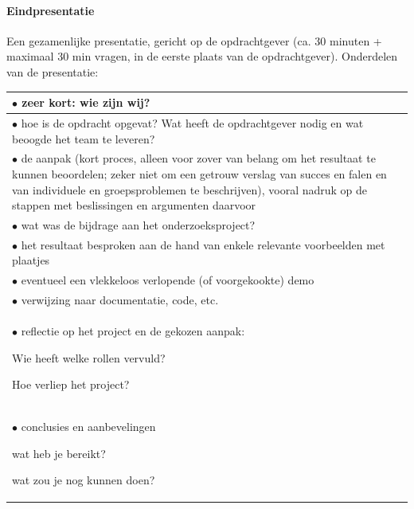 \paragraph{Eindpresentatie}
Een gezamenlijke presentatie, gericht op de opdrachtgever (ca. 30 minuten +
maximaal 30 min vragen, in de eerste plaats van de opdrachtgever).  Onderdelen
van de presentatie:

\begin{center}
    \begin{tabular}{p{27em}}
	\\\hline
	\par $\bullet$ zeer kort: wie zijn wij?
	\\\hline
	\par $\bullet$ hoe is de opdracht opgevat? Wat heeft de opdrachtgever nodig en wat beoogde
		het team te leveren?
	\\\hline
	\par $\bullet$ de aanpak (kort proces, alleen voor zover van belang om het resultaat te
	    kunnen beoordelen; zeker niet om een getrouw verslag van succes en falen en van
	    individuele en groepsproblemen te beschrijven), vooral nadruk op de stappen met
	    beslissingen en argumenten daarvoor
	\\\hline
	\par $\bullet$ wat was de bijdrage aan het onderzoeksproject?
	\\\hline
	\par $\bullet$ het resultaat besproken aan de hand van enkele
	    relevante voorbeelden met plaatjes
	\\\hline
	\par $\bullet$ eventueel een vlekkeloos verlopende (of voorgekookte) demo
	\\\hline
	\par $\bullet$ verwijzing naar documentatie, code, etc.
	\\\hline
	\par $\bullet$ reflectie op het project en de gekozen aanpak:
	    \par \qquad \leftpointright{} Wie heeft welke rollen vervuld?
	    \par \qquad \leftpointright{} Hoe verliep het project?
	\\\hline
	\par $\bullet$ conclusies en aanbevelingen
	    \par \qquad \leftpointright{} wat heb je bereikt?
	    \par \qquad \leftpointright{} wat zou je nog kunnen doen?
	\\\hline
    \end{tabular}
    \label{fig: presentatie onderdelen}
\end{center}

